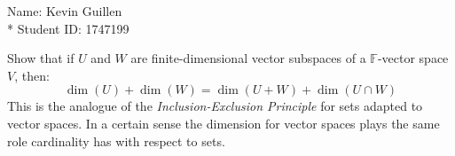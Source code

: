 \documentclass[12pt]{article}
\begin{document}
\begin{flushright}
    Name: Kevin Guillen \\*
    Student ID: 1747199
\end{flushright}
\begin{center}
    
\end{center}
Show that if $U$ and $W$ are finite-dimensional vector subspaces of a $\mathbb{F}$-vector space $V$, then:
\begin{equation*}
\dim(U) + \dim(W) = \dim(U + W) + \dim(U \cap W)
\end{equation*}
This is the analogue of the \textit{Inclusion-Exclusion Principle} for sets adapted to vector spaces. In a certain sense the dimension for vector spaces plays the same role cardinality has with respect to sets. 
\end{document}
